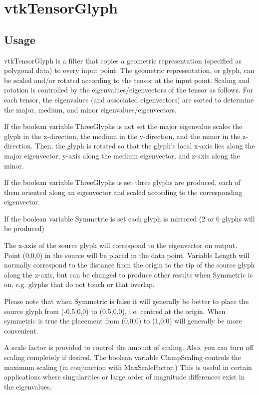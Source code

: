 \section{vtkTensorGlyph}

\subsection{Usage}

 vtkTensorGlyph is a filter that copies a geometric representation
 (specified as polygonal data) to every input point. The geometric
 representation, or glyph, can be scaled and/or rotated according to
 the tensor at the input point. Scaling and rotation is controlled
 by the eigenvalues/eigenvectors of the tensor as follows. For each
 tensor, the eigenvalues (and associated eigenvectors) are sorted to
 determine the major, medium, and minor eigenvalues/eigenvectors.

 If the boolean variable ThreeGlyphs is not set the major eigenvalue 
 scales the glyph in the x-direction, the medium in the y-direction, 
 and the minor in the  z-direction. Then, the glyph is rotated so 
 that the glyph's local x-axis lies along the major eigenvector, 
 y-axis along the medium eigenvector, and z-axis along the minor. 

 If the boolean variable ThreeGlyphs is set three glyphs are produced, 
 each of them oriented along an eigenvector and scaled according to the 
 corresponding eigenvector.

 If the boolean variable Symmetric is set each glyph is mirrored (2 or 6 
 glyphs will be produced)

 The x-axis of the source glyph will correspond to the eigenvector 
 on output. Point (0,0,0) in the source will be placed in the data point.
 Variable Length will normally correspond to the distance from the 
 origin to the tip of the source glyph along the x-axis, 
 but can be changed to produce other results when Symmetric is on,
 e.g. glyphs that do not touch or that overlap.

 Please note that when Symmetric is false it will generally be better 
 to place the source glyph from (-0.5,0,0) to (0.5,0,0), i.e. centred
 at the origin. When symmetric is true the placement from (0,0,0) to
 (1,0,0) will generally be more convenient.

 A scale factor is provided to control the amount of scaling. Also, you 
 can turn off scaling completely if desired. The boolean variable 
 ClampScaling controls the maximum scaling (in conjunction with
 MaxScaleFactor.) This is useful in certain applications where 
 singularities or large order of magnitude differences exist in 
 the eigenvalues.

